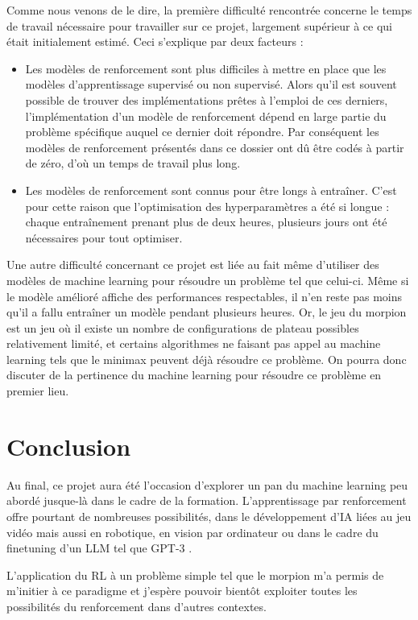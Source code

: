 \documentclass[french]{article}
\begin{document}
    Comme nous venons de le dire, la première difficulté rencontrée concerne le temps de travail nécessaire pour travailler sur ce projet, largement supérieur à ce qui était initialement estimé. Ceci s'explique par deux facteurs :
    \begin{itemize}
        \item Les modèles de renforcement sont plus difficiles à mettre en place que les modèles d'apprentissage supervisé ou non supervisé. Alors qu'il est souvent possible de trouver des implémentations prêtes à l'emploi de ces derniers, l'implémentation d'un modèle de renforcement dépend en large partie du problème spécifique auquel ce dernier doit répondre. Par conséquent les modèles de renforcement présentés dans ce dossier ont dû être codés à partir de zéro, d'où un temps de travail plus long.
        \item Les modèles de renforcement sont connus pour être longs à entraîner. C'est pour cette raison que l'optimisation des hyperparamètres a été si longue : chaque entraînement prenant plus de deux heures, plusieurs jours ont été nécessaires pour tout optimiser.
    \end{itemize}

    Une autre difficulté concernant ce projet est liée au fait même d'utiliser des modèles de machine learning pour résoudre un problème tel que celui-ci. Même si le modèle amélioré affiche des performances respectables, il n'en reste pas moins qu'il a fallu entraîner un modèle pendant plusieurs heures. Or, le jeu du morpion est un jeu où il existe un nombre de configurations de plateau possibles relativement limité, et certains algorithmes ne faisant pas appel au machine learning tels que le minimax peuvent déjà résoudre ce problème. On pourra donc discuter de la pertinence du machine learning pour résoudre ce problème en premier lieu.

    \section{Conclusion}

    Au final, ce projet aura été l'occasion d'explorer un pan du machine learning peu abordé jusque-là dans le cadre de la formation. L'apprentissage par renforcement offre pourtant de nombreuses possibilités, dans le développement d'IA liées au jeu vidéo mais aussi en robotique, en vision par ordinateur ou dans le cadre du finetuning d'un LLM tel que GPT-3 \cite{RL_LLM}. 

    L'application du RL à un problème simple tel que le morpion m'a permis de m'initier à ce paradigme et j'espère pouvoir bientôt exploiter toutes les possibilités du renforcement dans d'autres contextes.
\end{document}
